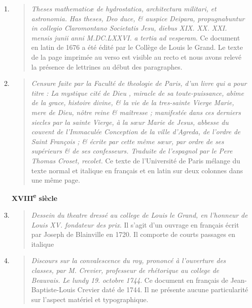 \documentclass[a4paper,12pt,twoside]{book}
\begin{document}
\begin{enumerate}
\begin{quote}
\end{quote}	
\item
\begin{quote}
	
	\emph{Theses mathematicæ de hydrostatica, architectura militari, et astronomia. Has theses, Deo duce, \& auspice Deipara, propugnabuntur in collegio Claromontano Societatis Jesu, diebus XIX. XX. XXI. mensis junii anni M.DC.LXXVI. a tertia ad vesperam}.
	Ce document en latin de 1676 a été édité par le Collège de Louis le Grand. Le texte de la page imprimée au verso est visible au recto et nous avons relevé la présence de lettrines au début des paragraphes.
	
\end{quote}	
\item
\begin{quote}
	
	\emph{Censure faite par la Faculté de theologie de Paris, d'un livre qui a pour titre : La mystique cité de Dieu , miracle de sa toute-puissance, abîme de la grace, histoire divine, \& la vie de la tres-sainte Vierge Marie, mere de Dieu, nôtre reine \& maîtresse ; manifestée dans ces derniers siecles par la sainte Vierge, à la sœur Marie de Jesus, abbesse du couvent de l'Immaculée Conception de la ville d'Agreda, de l'ordre de Saint François ; \& écrite par cette même sœur, par ordre de ses supérieurs \& de ses confesseurs. Traduite de l'espagnol par le Pere Thomas Croset, recolet. }
	Ce texte de l'Université de Paris mélange du texte normal et italique en français et en latin sur deux colonnes dans une même page. \\
	
	\end{quote}	

	
	\textbf{XVIII\textsuperscript{e} siècle} \\
	

	\item
	\begin{quote}
	
	\emph{Dessein du theatre dressé au college de Louis le Grand, en l'honneur de Louis XV. fondateur des prix}.
	Il s'agit d'un ouvrage en français écrit par Joseph de Blainville en 1720. Il comporte de courts passages en italique
	
\end{quote}	
\item
\begin{quote}
	
	\emph{Discours sur la convalescence du roy, prononcé à l'ouverture des classes, par M. Crevier, professeur de rhétorique au college de Beauvais. Le lundy 19. octobre 1744}.
	Ce document en français de Jean-Baptiste-Louis Crevier daté de 1744. Il ne présente aucune particularité sur l'aspect matériel et typographique. 
	

\end{quote}
\end{enumerate}
\end{document}
